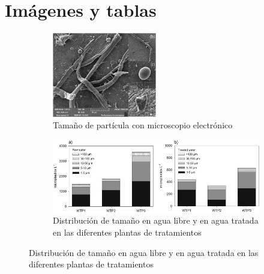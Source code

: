 \documentclass[a4paper,11pt]{article}
\begin{document}
\section{Imágenes y tablas}
	\begin{figure}[H]
		\centering
		\begin{subfigure}{0.45\textwidth}
			\includegraphics[width=0.5\textwidth]{electronico.jpg}
			\caption{Tamaño de partícula con microscopio electrónico}
		\end{subfigure}
		\begin{subfigure}{0.45\textwidth}
		\includegraphics[width=1.2\textwidth]{size.jpg}
		\caption{Distribución de tamaño en agua libre y en agua tratada en las diferentes plantas de tratamientos}
		\end{subfigure}
		
	\end{figure}
	
\end{document}
